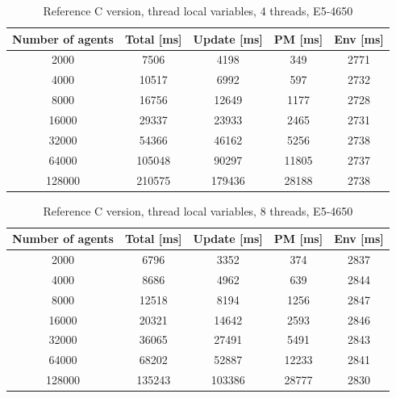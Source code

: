 \documentclass[12pt, a4paper]{report}
\begin{document}
\begin{appendices}
\begin{table}[H]
  \begin{center}
    \begin{tabular}{|c||c||c|c|c|}
    \hline
    Number of agents & Total [ms] & Update [ms] & PM [ms] & Env [ms] \\ \hline
    2000             & 7506       & 4198        & 349     & 2771     \\
    4000             & 10517      & 6992        & 597     & 2732     \\
    8000             & 16756      & 12649       & 1177    & 2728     \\
    16000            & 29337      & 23933       & 2465    & 2731     \\
    32000            & 54366      & 46162       & 5256    & 2738     \\
    64000            & 105048     & 90297       & 11805   & 2737     \\
    128000           & 210575     & 179436      & 28188   & 2738     \\ \hline
    \end{tabular}
    \caption {Reference C version, thread local variables, 4 threads, E5-4650}
    \label{table:append-reference-timings-4-thread-potoo}
  \end{center}
\end{table}

\begin{table}[H]
  \begin{center}
    \begin{tabular}{|c||c||c|c|c|}
    \hline
    Number of agents & Total [ms] & Update [ms] & PM [ms] & Env [ms] \\ \hline
    2000             & 6796       & 3352        & 374     & 2837     \\
    4000             & 8686       & 4962        & 639     & 2844     \\
    8000             & 12518      & 8194        & 1256    & 2847     \\
    16000            & 20321      & 14642       & 2593    & 2846     \\
    32000            & 36065      & 27491       & 5491    & 2843     \\
    64000            & 68202      & 52887       & 12233   & 2841     \\
    128000           & 135243     & 103386      & 28777   & 2830     \\ \hline
    \end{tabular}
    \caption {Reference C version, thread local variables, 8 threads, E5-4650}
    \label{table:append-reference-timings-8-thread-potoo}
  \end{center}
\end{table}


\end{appendices}
\end{document}
